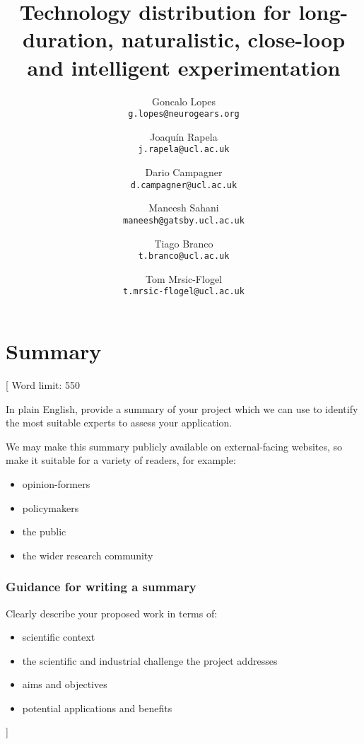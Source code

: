 \documentclass{article}
\title{Technology distribution for long-duration, naturalistic, close-loop
and intelligent experimentation}
\author{
    Goncalo Lopes\\
    \texttt{g.lopes@neurogears.org}\and
    Joaqu\'{i}n Rapela\\
    \texttt{j.rapela@ucl.ac.uk}\and
    Dario Campagner\\
    \texttt{d.campagner@ucl.ac.uk}\and
    Maneesh Sahani\\
    \texttt{maneesh@gatsby.ucl.ac.uk}\and
    Tiago Branco\\
    \texttt{t.branco@ucl.ac.uk}\and
    Tom Mrsic-Flogel\\
    \texttt{t.mrsic-flogel@ucl.ac.uk}
}
\newcommand{\desc}[1]{{\leavevmode\color{blue}[#1]}}
\begin{document}
\maketitle

\section{Summary}
\desc{
Word limit: 550

In plain English, provide a summary of your project which we can use to
identify the most suitable experts to assess your application.

We may make this summary publicly available on external-facing websites, so
make it suitable for a variety of readers, for example:

\begin{itemize}
    \item opinion-formers

    \item policymakers

    \item the public

    \item the wider research community
\end{itemize}

\subsubsection*{Guidance for writing a summary}

Clearly describe your proposed work in terms of:

\begin{itemize}
    \item scientific context

    \item the scientific and industrial challenge the project addresses

    \item aims and objectives

    \item potential applications and benefits
\end{itemize}
}


\end{document}
